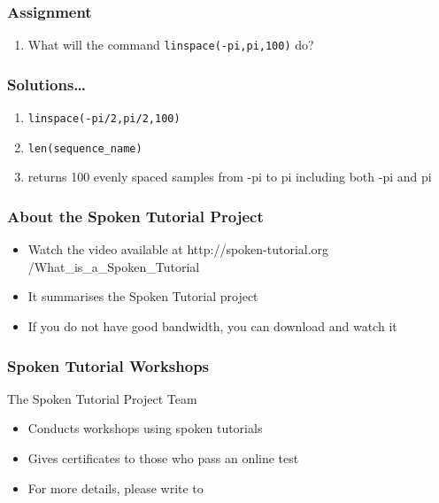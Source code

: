 \documentclass[17pt]{beamer}
\newcounter{saveenumi}
\newcommand{\conti}{\setcounter{enumi}{\value{saveenumi}}}
\begin{document}
\begin{frame}
\frametitle{Assignment}
\label{sec-7.2}
\begin{enumerate}
	\conti
\item What will the command \texttt{linspace(-pi,pi,100)} do?
\begin{itemize}
\end{itemize}
\end{enumerate}
\end{frame}
\begin{frame}
\frametitle{Solutions\ldots{}}
\label{sec-8}
\begin{enumerate}
\item \texttt{linspace(-pi/2,pi/2,100)}
\item \texttt{len(sequence\_name)}
\item returns 100 evenly spaced samples from -pi to pi including both -pi and pi
\end{enumerate}
\end{frame}
\begin{frame}
\frametitle{About the Spoken Tutorial Project}
\begin{itemize}
\item Watch the video available at {\color{blue}http://spoken-tutorial.org /What\_is\_a\_Spoken\_Tutorial}
\item It summarises the Spoken Tutorial project 
\item If you do not have good bandwidth, you can download and watch it
\end{itemize}
\end{frame}
\begin{frame}
\frametitle{Spoken Tutorial Workshops}The Spoken Tutorial Project Team 
\begin{itemize}
\item Conducts workshops using spoken tutorials 
\item Gives certificates to those who pass an online test 
\item For more details, please write to \\ 
\end{itemize}
\end{frame}
\end{document}
